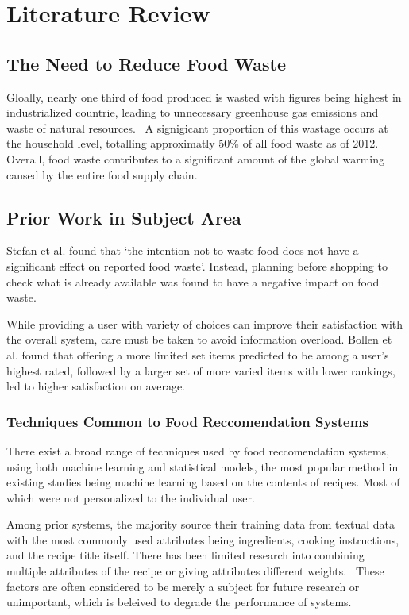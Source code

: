 \section{Literature Review}

\subsection{The Need to Reduce Food Waste}
Gloally, nearly one third of food produced is wasted with figures being highest
in industrialized countrie, leading to unnecessary greenhouse gas emissions and
waste of natural resources.~\cite{gustavsson_global_2011} A signigicant proportion
of this wastage occurs at the household level, totalling approximatly 50\% of all
food waste as of 2012.~\cite{stenmarck_estimates_2016} Overall, food waste contributes
to a significant amount of the global warming caused by the entire food supply
chain.~\cite{scherhaufer_environmental_2018}

\subsection{Prior Work in Subject Area}
Stefan et al. found that \enquote*{the intention not to waste food does not have a
significant effect on reported food waste}. Instead, planning before shopping to
check what is already available was found to have a negative impact on food waste.~\cite{stefan_avoiding_2013}

While providing a user with variety of choices can improve their satisfaction
with the overall system, care must be taken to avoid information overload.
Bollen et al. found that offering a more limited set items predicted to be among a user's
highest rated, followed by a larger set of more varied items with lower rankings, led to
higher satisfaction on average.~\cite{bollen_understanding_2010}

\subsubsection{Techniques Common to Food Reccomendation Systems}
There exist a broad range of techniques used by food reccomendation systems, using both machine learning
and statistical models, the most popular method in existing studies being machine learning based on the
contents of recipes. Most of which were not personalized to the individual user.~\cite{bondevik_systematic_2024}

Among prior systems, the majority source their training data from textual data with the most commonly used
attributes being ingredients, cooking instructions, and the recipe title itself. There has been limited research
into combining multiple attributes of the recipe or giving attributes different weights.~\cite{chen_cross-modal_2017} These factors are often
considered to be merely a subject for future research or unimportant, which is beleived to degrade the performance
of systems.~\cite{bondevik_systematic_2024}

